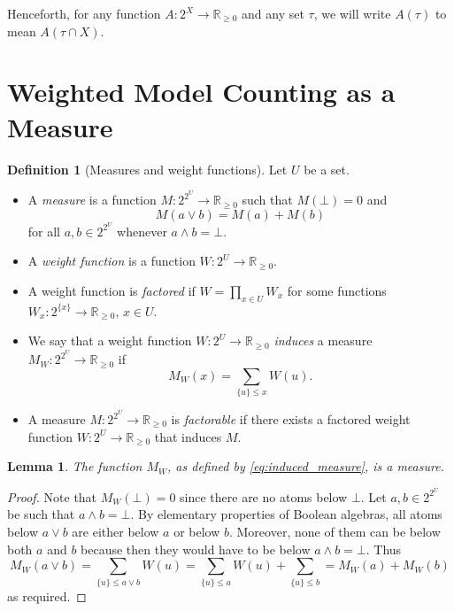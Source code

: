 \documentclass{article}
\newtheorem{lemma}{Lemma}
\theoremstyle{definition}
\newtheorem{definition}{Definition}
\theoremstyle{remark}
\begin{document}
Henceforth, for any function $A\colon 2^X \to \mathbb{R}_{\ge 0}$ and any set
$\tau$, we will write $A(\tau)$ to mean $A(\tau \cap X)$.

\section{Weighted Model Counting as a Measure}

\begin{definition}[Measures and weight functions] \label{def:wmc}
  Let $U$ be a set.
  \begin{itemize}
  \item A \emph{measure} is a function $M\colon 2^{2^U} \to \mathbb{R}_{\ge 0}$
    such that $M(\bot) = 0$ and
    \[
      M(a \lor b) = M(a) + M(b)
    \]
    for all $a, b \in 2^{2^U}$ whenever $a \land b = \bot$.
  \item A \emph{weight function} is a function $W\colon 2^U \to \mathbb{R}_{\ge
      0}$.
  \item A weight function is \emph{factored} if $W = \prod_{x \in U} W_x$ for
    some functions $W_x\colon 2^{\{x\}} \to \mathbb{R}_{\ge 0}$, $x \in U$.
  \item We say that a weight function $W\colon 2^U \to \mathbb{R}_{\ge 0}$
    \emph{induces} a measure $M_W\colon 2^{2^U} \to \mathbb{R}_{\ge 0}$ if
    \begin{equation} \label{eq:induced_measure}
      M_W(x) = \sum_{\{u\} \le x} W(u).
    \end{equation}
  \item A measure $M\colon 2^{2^U} \to \mathbb{R}_{\ge 0}$ is
    \emph{factorable} if there exists a factored weight function $W\colon 2^U
    \to \mathbb{R}_{\ge 0}$ that induces $M$.
  \end{itemize}
\end{definition}

\begin{lemma} \label{prop:measure}
  The function $M_W$, as defined by \cref{eq:induced_measure}, is a measure.
\end{lemma}
\begin{proof}
  Note that $M_W(\bot) = 0$ since there are no atoms below $\bot$. Let $a, b \in
  2^{2^{U}}$ be such that $a \land b = \bot$. By elementary properties of
  Boolean algebras, all atoms below $a \lor b$ are either below $a$ or below
  $b$. Moreover, none of them can be below both $a$ and $b$ because then they
  would have to be below $a \land b = \bot$. Thus
  \[
    M_W(a \lor b) = \sum_{\{u\} \le a \lor b} W(u) = \sum_{\{u\} \le a} W(u) +
    \sum_{\{u\} \le b} = M_W(a) + M_W(b)
  \]
  as required.
\end{proof}
\end{document}
